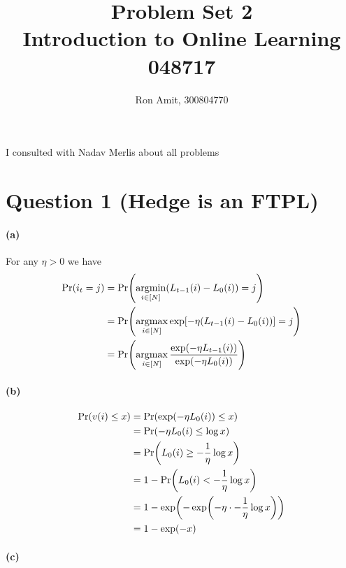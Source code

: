\documentclass{article}
\title{Problem Set 2 \\ Introduction to Online Learning 048717}
\author{Ron Amit, 300804770 }
\DeclareMathOperator*{\argmin}{argmin}
\DeclareMathOperator*{\argmax}{argmax}
\DeclarePairedDelimiter\br{(}{)}%
\DeclarePairedDelimiter\brs{[}{]}%
\begin{document}
\maketitle
I consulted with Nadav Merlis about all problems
\section{Question 1 (Hedge is an FTPL)}

\paragraph{(a)}
For any $\eta >0$ we have
\begin{align*}
    \Pr \br*{i_t = j} 
    &= \Pr \br*{\argmin_{i \in [N]} \br*{L_{t-1}(i)-L_0(i)} = j} \\
    &= \Pr \br*{\argmax_{i \in [N]} \exp \brs*{ -\eta \br*{L_{t-1}(i)-L_0(i)}} = j} \\
    &= \Pr \br*{\argmax_{i \in [N]} \frac{\exp \br*{ -\eta L_{t-1}(i)}}{\exp \br*{-\eta L_0(i)}} }
\end{align*}

\paragraph{(b)}


\begin{align*}
    \Pr \br*{v(i) \leq x} 
    &=   \Pr \br*{\exp\br*{-\eta L_0(i)} \leq x} \\
    &=   \Pr \br*{-\eta L_0(i) \leq \log x} \\
    &=   \Pr \br*{L_0(i) \geq - \frac{1}{\eta} \log x} \\
    &=   1 - \Pr \br*{L_0(i) < - \frac{1}{\eta} \log x} \\ 
    & = 1 - \exp\br*{-\exp\br*{-\eta \cdot - \frac{1}{\eta} \log x }}\\
    &= 1 - \exp\br*{-x}
\end{align*}

\paragraph{(c)}
\end{document}
